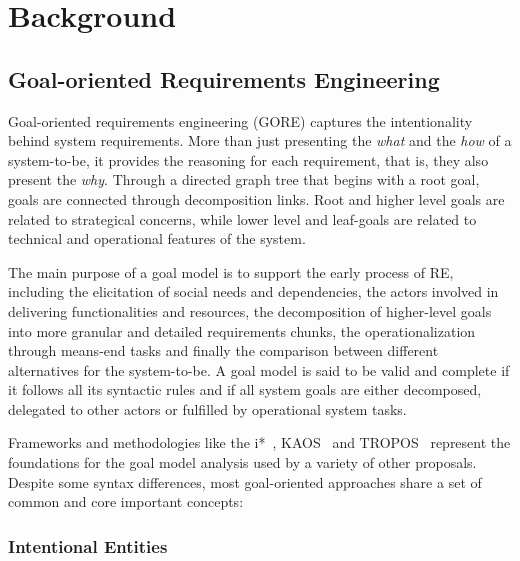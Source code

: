 \chapter{Background}\label{ch:baseline}%

\section{Goal-oriented Requirements Engineering}

Goal-oriented requirements engineering (GORE) captures the intentionality behind system requirements. More than just presenting the \textit{what} and the \textit{how} of a system-to-be, it provides the reasoning for each requirement, that is, they also present the \textit{why}. Through a directed graph tree that begins with a root goal, goals are connected through decomposition links. Root and higher level goals are related to strategical concerns, while lower level and leaf-goals are related to technical and operational features of the system. 

The main purpose of a goal model is to support the early process of RE, including the elicitation of social needs and dependencies, the actors involved in delivering functionalities and resources, the decomposition of higher-level goals into more granular and detailed requirements chunks, the operationalization through means-end tasks and finally the comparison between different alternatives for the system-to-be. A goal model is said to be valid and complete if it follows all its syntactic rules and if all system goals are either decomposed, delegated to other actors or fulfilled by operational system tasks. 

Frameworks and methodologies like the i*~\cite{Yu1996}, KAOS~\cite{Dardenne1993} and TROPOS~\cite{Bresciani:2004} represent the foundations for the goal model analysis used by a variety of other proposals. Despite some syntax differences, most goal-oriented approaches share a set of common and core important concepts:
\bigskip


\subsection{Intentional Entities}

